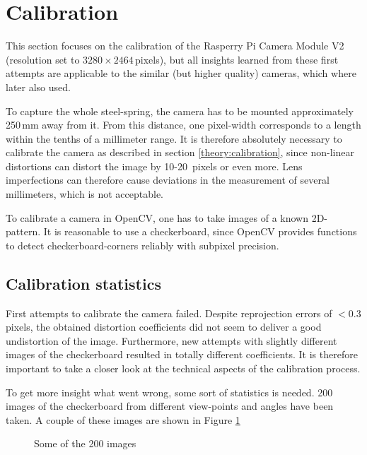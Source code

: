 \section{Calibration}
This section focuses on the calibration of the Rasperry Pi Camera Module V2 (resolution set to $3280\times 2464$\,pixels),
but all insights learned from these first attempts are applicable to the similar (but higher quality) cameras, which where later also used.

To capture the whole steel-spring, the camera has to be mounted approximately 250\,mm away from it.
From this distance, one pixel-width corresponds to a length within the tenths of a millimeter range.
It is therefore absolutely necessary to calibrate the camera as described in section \ref{theory:calibration}, since non-linear distortions can distort the image by 10-20\, pixels or even more.
Lens imperfections can therefore cause deviations in the measurement of several millimeters, which is not acceptable.

To calibrate a camera in OpenCV, one has to take images of a known 2D-pattern.
It is reasonable to use a checkerboard, since OpenCV provides functions to detect checkerboard-corners reliably with subpixel precision.

\subsection{Calibration statistics\label{development:statistics}}
First attempts to calibrate the camera failed.
Despite reprojection errors of $<0.3$ pixels, the obtained distortion coefficients did not seem to deliver a good undistortion of the image.
Furthermore, new attempts with slightly different images of the checkerboard resulted in totally different coefficients. 
It is therefore important to take a closer look at the technical aspects of the calibration process.

To get more insight what went wrong, some sort of statistics is needed.
200 images of the checkerboard from different view-points and angles have been taken.
A couple of these images are shown in Figure  \ref{development:im}

\begin{figure}[ht]
	\centering
	
	\caption{Some of the 200 images \label{development:im}}		
\end{figure}

